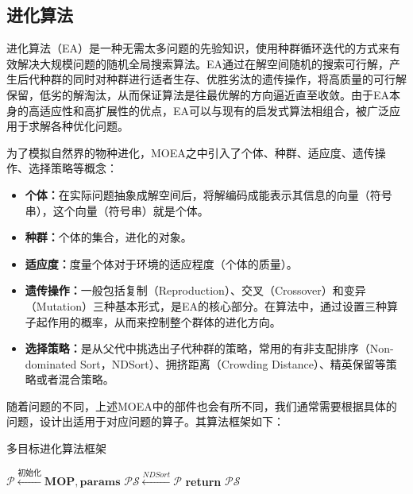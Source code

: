 \subsection{进化算法}
\label{subsec:背景介绍:多目标组合优化算法:进化算法}
进化算法（EA）是一种无需太多问题的先验知识，使用种群循环迭代的方式来有效解决大规模问题的随机全局搜索算法。EA通过在解空间随机的搜索可行解，产生后代种群的同时对种群进行适者生存、优胜劣汰的遗传操作，将高质量的可行解保留，低劣的解淘汰，从而保证算法是往最优解的方向逼近直至收敛。由于EA本身的高适应性和高扩展性的优点，EA可以与现有的启发式算法相组合，被广泛应用于求解各种优化问题。
\par
为了模拟自然界的物种进化，MOEA之中引入了个体、种群、适应度、遗传操作、选择策略等概念：
\begin{itemize}
    \item \textbf{个体：}在实际问题抽象成解空间后，将解编码成能表示其信息的向量（符号串），这个向量（符号串）就是个体。
    \item \textbf{种群：}个体的集合，进化的对象。
    \item \textbf{适应度：}度量个体对于环境的适应程度（个体的质量）。
    \item \textbf{遗传操作：}一般包括复制（Reproduction）、交叉（Crossover）和变异（Mutation）三种基本形式，是EA的核心部分。在算法中，通过设置三种算子起作用的概率，从而来控制整个群体的进化方向。
    \item \textbf{选择策略：}是从父代中挑选出子代种群的策略，常用的有非支配排序（Non-dominated Sort，NDSort）\cite{srinivas1994muiltiobjective,jensen2003reducing,tang2008fast,mcclymont2012deductive,zhang2014efficient}、拥挤距离（Crowding Distance）\cite{kundu2011multi}、精英保留等策略\cite{deb2002fast}或者混合策略。
\end{itemize}
\par
随着问题的不同，上述MOEA中的部件也会有所不同，我们通常需要根据具体的问题，设计出适用于对应问题的算子。其算法框架如下：
\begin{algorithm}
    \caption{多目标进化算法框架}
    \label{alg:多目标进化算法框架}
    \BlankLine
    $\mathcal{P} \xleftarrow[]{\text{初始化}} \mathbf{MOP},\mathbf{params}$ \;
    $\mathcal{PS} \xleftarrow[]{NDSort} \mathcal{P} $ \;
    \textbf{return } $\mathcal{PS}$ \;
\end{algorithm}
